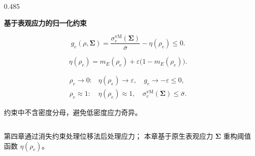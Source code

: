 \documentclass[notheorems]{beamer}
\begin{document}
\begin{frame}
{\begin{columns}[T, totalwidth=\linewidth]
\begin{column}{0.485\linewidth}
\begin{tcolorbox}
						{\fontsize{7.75}{10.2}\selectfont\sffamily
							\setlength{\abovedisplayskip}{4pt}
							\setlength{\belowdisplayskip}{4pt}
							
							\centering
							{\bfseries 基于表观应力的归一化约束}
							
							\vspace{-0.9em}
							
							\[
							g_e(\rho,\boldsymbol{\Sigma})
							=
							\frac{
								\sigma^{\mathrm{vM}}_e(\boldsymbol{\Sigma})
							}{\bar{\sigma}}
							-
							\eta(\rho_e)
							\le 0 .
							\]
							
							\vspace{-0.9em}
							
							\[
							\eta(\rho_e)
							=
							m_E(\rho_e)
							+
							\varepsilon
							\bigl(1-m_E(\rho_e)\bigr).
							\]
							
							\vspace{-0.5em}
							
							\[
							\begin{array}{ll}
								\rho_e\to0:
								&
								\eta(\rho_e)\to\varepsilon,\quad
								g_e\to-\varepsilon\le0,
								\\[2pt]
								\rho_e\approx1:
								&
								\eta(\rho_e)\approx1,\quad
								\sigma^{\mathrm{vM}}_e(\boldsymbol{\Sigma})
								\le\bar{\sigma}.
							\end{array}
							\]
							
							{\fontsize{7.2}{10.2}\selectfont
								约束中不含密度分母，避免低密度应力奇异。}
						}
					\end{tcolorbox}
				\end{column}
				
			\end{columns}
			
			
			\begin{tcolorbox}[
				colback=structure.fg,
				colframe=structure.fg,
				coltext=white,
				boxrule=0pt,
				arc=3pt,
				top=3pt, bottom=3pt, left=8pt, right=8pt]
				\centering
				{\fontsize{7.45}{10.0}\selectfont\sffamily
					第四章通过消失约束处理位移法后处理应力；
					本章基于原生表观应力
					\(\boldsymbol{\Sigma}\)
					重构阈值函数
					\(\eta(\rho_e)\)。}
			\end{tcolorbox}
		}
		
	\end{frame}
	
\end{document}
